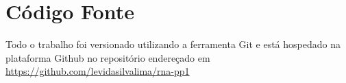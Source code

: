 \section{Código Fonte}

Todo o trabalho foi versionado utilizando a ferramenta Git e está hospedado na plataforma Github no repositório endereçado em \url{https://github.com/levidasilvalima/rna-pp1}
